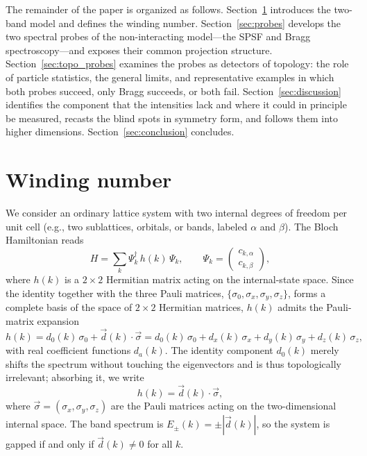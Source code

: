\documentclass[onecolumn,aps,prl,superscriptaddress,longbibliography]{revtex4-2}
\begin{document}
The remainder of the paper is organized as follows. Section~\ref{sec:twoband} introduces the two-band model and defines the winding number. Section~\ref{sec:probes} develops the two spectral probes of the non-interacting model---the SPSF and Bragg spectroscopy---and exposes their common projection structure. Section~\ref{sec:topo_probes} examines the probes as detectors of topology: the role of particle statistics, the general limits, and representative examples in which both probes succeed, only Bragg succeeds, or both fail. Section~\ref{sec:discussion} identifies the component that the intensities lack and where it could in principle be measured, recasts the blind spots in symmetry form, and follows them into higher dimensions. Section~\ref{sec:conclusion} concludes.


\section{Winding number}\label{sec:twoband}

We consider an ordinary lattice system with two internal degrees of freedom per unit cell (e.g., two sublattices, orbitals, or bands, labeled $\alpha$ and $\beta$). The Bloch Hamiltonian reads
\begin{equation}
  H = \sum_k \Psi_k^\dagger\, h(k)\, \Psi_k,
  \qquad
  \Psi_k = \begin{pmatrix} c_{k,\alpha} \\ c_{k,\beta} \end{pmatrix},
\end{equation}
where $h(k)$ is a $2\times 2$ Hermitian matrix acting on the internal-state space. Since the identity together with the three Pauli matrices, $\{\sigma_0,\sigma_x,\sigma_y,\sigma_z\}$, forms a complete basis of the space of $2\times 2$ Hermitian matrices, $h(k)$ admits the Pauli-matrix expansion
\begin{equation}
  h(k) = d_0(k)\,\sigma_0 + \vec{d}(k)\cdot\vec{\sigma}
       = d_0(k)\,\sigma_0 + d_x(k)\,\sigma_x + d_y(k)\,\sigma_y + d_z(k)\,\sigma_z,
\end{equation}
with real coefficient functions $d_a(k)$. The identity component $d_0(k)$ merely shifts the spectrum without touching the eigenvectors and is thus topologically irrelevant; absorbing it, we write
\begin{equation}
  h(k) = \vec{d}(k)\cdot\vec{\sigma},
\end{equation}
where $\vec{\sigma}=(\sigma_x,\sigma_y,\sigma_z)$ are the Pauli matrices acting on the two-dimensional internal space. The band spectrum is $E_\pm(k)=\pm|\vec{d}(k)|$, so the system is gapped if and only if $\vec{d}(k)\neq 0$ for all $k$.
\end{document}
